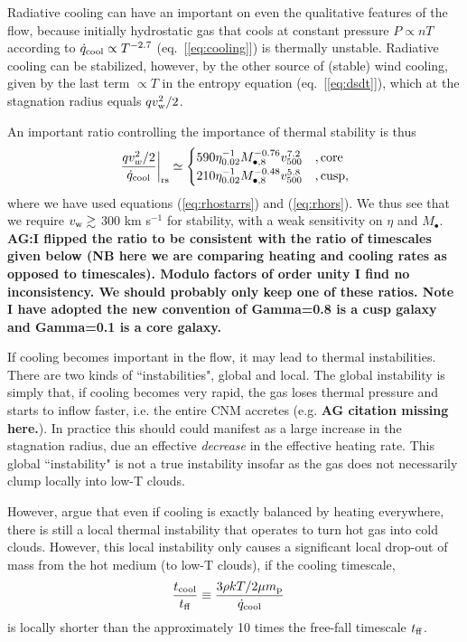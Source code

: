 \documentclass[usenatbib,fleqn]{mn2e}
\newcommand{\vw}{v_w}
\renewcommand{\mp}{m_{\rm p}}
\newcommand{\tcool}{t_{\rm cool}}
\newcommand{\tff}{t_{\rm ff}}
\begin{document}
Radiative cooling can have an important on even the qualitative features of the flow, because initially hydrostatic gas that cools at constant pressure $P \propto nT$ according to $\dot{q}_{\rm cool} \propto T^{-2.7}$ (eq.~[\ref{eq:cooling}]) is thermally unstable.  Radiative cooling can be stabilized, however, by the other source of (stable) wind cooling, given by the last term $\propto T$ in the entropy equation (eq.~[\ref{eq:dsdt}]), which at the stagnation radius equals $q v_{\rm w}^{2}/2$.

An important ratio controlling the importance of thermal stability is thus
\begin{align}
\left.\frac{q \vw^2/2}{\dot{q}_{\rm cool}}\right|_{\rm r{s}} \simeq
  \begin{cases}
   590 \eta_{0.02}^{-1} M_{\bullet,8}^{-0.76}v_{500}^{7.2}  &, \text{core}\\
   210 \eta_{0.02}^{-1} M_{\bullet,8}^{-0.48}v_{500}^{5.8}  &, \text{cusp},     
  \end{cases}
  \label{eq:cooling2}
\end{align}
where we have used equations (\ref{eq:rhostarrs}) and
(\ref{eq:rhors}).  We thus see that we require $v_{\rm w} \gtrsim $
300 km s$^{-1}$ for stability, with a weak sensitivity on $\eta$ and
$M_{\bullet}$.  {\bf AG:I flipped the ratio to be consistent with the
  ratio of timescales given below (NB here we are comparing heating
  and cooling rates as opposed to timescales). Modulo factors of order
  unity I find no inconsistency. We should probably only keep one of
  these ratios. Note I have adopted the new convention of Gamma=0.8 is
  a cusp galaxy and Gamma=0.1 is a core galaxy.}



If cooling becomes important in the flow, it may lead to thermal
instabilities.  There are two kinds of ``instabilities", global and
local.  The global instability is simply that, if cooling becomes very
rapid, the gas loses thermal pressure and starts to inflow faster,
i.e. the entire CNM accretes (e.g. {\bf AG citation missing here.}).  In
practice this should could manifest as a large increase in the
stagnation radius, due an effective {\it decrease} in the effective
heating rate.  This global ``instability" is not a true instability
insofar as the gas does not necessarily clump locally into low-T
clouds.

However, \citet{McCourt+12} argue that even if cooling is exactly
balanced by heating everywhere, there is still a local thermal
instability that operates to turn hot gas into cold clouds.  However,
this local instability only causes a significant local drop-out of
mass from the hot medium (to low-T clouds), if the cooling timescale,
\begin{align}
\frac{\tcool}{\tff} &\equiv \frac{3\rho k T/2 \mu \mp}{\dot{q}_{\rm cool}}
\end{align} 
is locally shorter than the approximately 10 times the free-fall
timescale $t_{\rm ff}$. 
\end{document}
